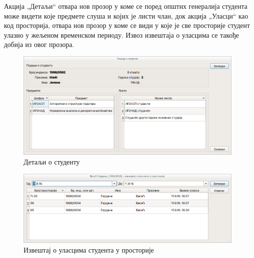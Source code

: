 \documentclass[a4paper, 12pt, diplomski]{etfcyr}
\def\quote#1{„#1“}
\begin{document}
\begin{justify}
					Акција \quote{Детаљи} отвара нов прозор у коме се поред општих генералија студента може видети које предмете слуша и којих је листи члан, док акција \quote{Уласци} као код просторија, отвара нов прозор у коме се види у које је све просторије студент улазио у жељеном временском периоду. Извоз извештаја о уласцима се такође добија из овог прозора.
					\begin{figure}[H]
						\begin{center}
							\includegraphics[width=1.0\textwidth]{manual/student_details_dialog.png}
						\end{center}
						\caption{Детаљи о студенту}
						\label{figure:student_details_dialog}
					\end{figure}
					\begin{figure}[H]
						\begin{center}
							\includegraphics[width=1.0\textwidth]{manual/student_entries.png}
						\end{center}
						\caption{Извештај о уласцима студента у просторије}
						\label{figure:student_entries_dialog}
					\end{figure}
				\end{justify}

			\newpage
\end{document}
